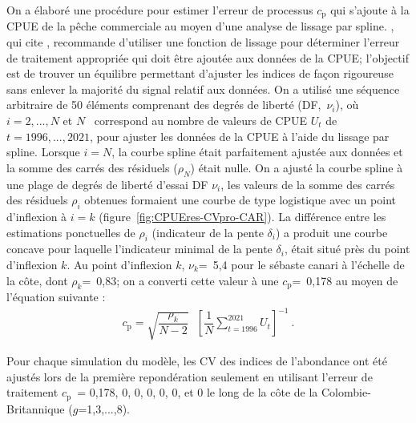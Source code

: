 \documentclass[11pt]{book}
\def\vsd{\vspace*{1ex}}     %
\renewcommand{\eb}{\vsd \vsd \begin{eqnarray}}
\renewcommand{\ee}{\end{eqnarray} \vsd }
\begin{document}
On a \'{e}labor\'{e} une proc\'{e}dure pour estimer l'erreur de processus $c_\text{p}$ qui s'ajoute \`{a} la CPUE de la p\^{e}che commerciale au moyen d'une analyse de lissage par spline.
\citet{Francis:2011}, qui cite \citet{Clark-Hare:2006}, recommande d'utiliser une fonction de lissage pour d\'{e}terminer l'erreur de traitement appropri\'{e}e qui doit \^{e}tre ajout\'{e}e aux donn\'{e}es de la CPUE; l'objectif est de trouver un \'{e}quilibre permettant d'ajuster les indices de fa\c{c}on rigoureuse sans enlever la majorit\'{e} du signal relatif aux donn\'{e}es.
On a utilis\'{e} une s\'{e}quence arbitraire de 50 \'{e}l\'{e}ments comprenant des degr\'{e}s de libert\'{e} (DF,~$\nu_i$), o\`{u} $i=2,...,N$ et $N$~ correspond au nombre de valeurs de CPUE $U_t$ de $t=1996,...,2021$, pour ajuster les donn\'{e}es de la CPUE \`{a} l'aide du lissage par spline.
Lorsque $i=N$, la courbe spline \'{e}tait parfaitement ajust\'{e}e aux donn\'{e}es et la somme des carr\'{e}s des r\'{e}siduels ($\rho_N$) \'{e}tait nulle.
On a ajust\'{e} la courbe spline \`{a} une plage de degr\'{e}s de libert\'{e} d'essai DF $\nu_i$, les valeurs de la somme des carr\'{e}s des r\'{e}siduels $\rho_i$ obtenues formaient une courbe de type logistique avec un point d'inflexion \`{a} $i=k$ (figure~\ref{fig:CPUEres-CVpro-CAR}).
La diff\'{e}rence entre les estimations ponctuelles de $\rho_i$ (indicateur de la pente $\delta_i$) a produit une courbe concave pour laquelle l'indicateur minimal de la pente $\delta_i$, \'{e}tait situ\'{e} pr\`{e}s du point d'inflexion $k$.
Au point d'inflexion $k$, $\nu_k$=~5,4 pour le s\'{e}baste canari \`{a} l'\'{e}chelle de la c\^{o}te, dont $\rho_k$=~0,83; on a converti cette valeur \`{a} une $c_\text{p}$=~0,178 au moyen de l'\'{e}quation suivante :
\vspace{-0.25\baselineskip}%
\eb
c_\text{p} = \sqrt{\dfrac{\rho_k}{N-2}}~~~{\left[ \dfrac{1}{N} \sum\limits_{t=1996}^{2021} U_t \right]}^{-1}~. \label{cvpro.cpue}
\ee

Pour chaque simulation du mod\`{e}le, les CV des indices de l'abondance ont \'{e}t\'{e} ajust\'{e}s lors de la premi\`{e}re repond\'{e}ration seulement en utilisant l'erreur de traitement $c_\text{p}$~= 0,178, 0, 0, 0, 0, 0, et 0 le long de la c\^{o}te de la Colombie-Britannique ($g$=1,3,...,8).

\graphicspath{{./french/}}  %
\end{document}
